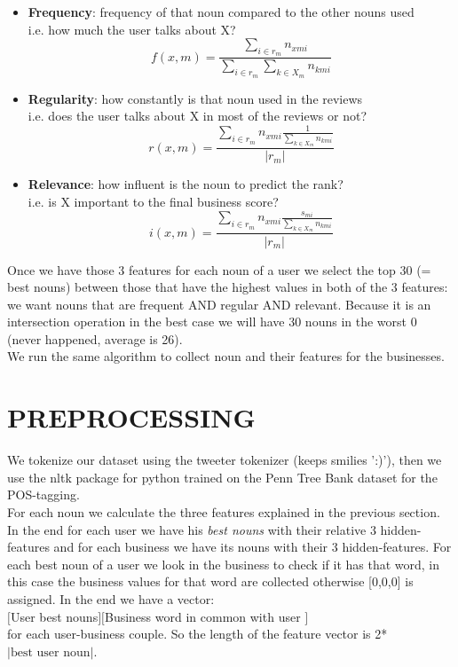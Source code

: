 \documentclass[a4paper, 10pt, conference]{ieeeconf}      %
\begin{document}
\begin{itemize}
	\item \textbf{Frequency}: frequency of that noun compared to the other nouns used\\
	i.e. how much the user talks about X?
	\[ f(x,m)= \frac{\sum_{i \in r_m}n_{xmi}}{\sum_{i \in r_m}\sum_{k \in X_m} n_{kmi}} \]
	\item \textbf{Regularity}: how constantly is that noun used in the reviews\\
	i.e. does the user talks about X in most of the reviews or not?
	\[ r(x,m)= \frac{\sum_{i \in r_m}
		n_{xmi}  \frac{1}{\sum_{k \in X_m}n_{kmi}}}	
				{|r_m|} \]
	\item \textbf{Relevance}: how influent is the noun to predict the rank?\\
	i.e. is X important to the final business score?
	\[ i(x,m)= \frac{\sum_{i \in r_m}
		n_{xmi}  \frac{s_{mi}}{\sum_{k \in X_m}n_{kmi}}}	
	{|r_m|} \]
\end{itemize}
Once we have those 3 features for each noun of a user we select the top 30 (= best nouns) between those that have the highest values in both of the 3 features: we want nouns that are frequent AND regular AND relevant. Because it is an intersection operation in the best case we will have 30 nouns in the worst 0 (never happened, average is 26).\\
We run the same algorithm to collect noun and their features for the businesses.
\section{PREPROCESSING}
We tokenize our dataset using the tweeter tokenizer (keeps smilies ':)'), then we use the nltk package for python trained on the  Penn Tree Bank dataset for the POS-tagging.\\
For each noun we calculate the three features explained in the previous section.
In the end for each user we have his\textit{ best nouns} with their relative 3 hidden-features and for each business we have its nouns with their 3 hidden-features. For each best noun of a user we look in the business to check if it has that word, in this case the business values for that word are collected otherwise [0,0,0] is assigned.
In the end we have a vector:\\
$[$User best nouns$][$Business word in common with user $]$\\
for each user-business couple.
So the length of the feature vector is 2* $|\text{best user noun}|$.
\end{document}
